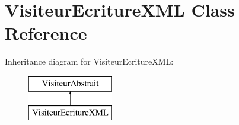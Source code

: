 \hypertarget{class_visiteur_ecriture_x_m_l}{}\section{Visiteur\+Ecriture\+X\+ML Class Reference}
\label{class_visiteur_ecriture_x_m_l}
Inheritance diagram for Visiteur\+Ecriture\+X\+ML\+:\begin{figure}[H]
\begin{center}
\leavevmode
\includegraphics[height=2.000000cm]{class_visiteur_ecriture_x_m_l}
\end{center}
\end{figure}
